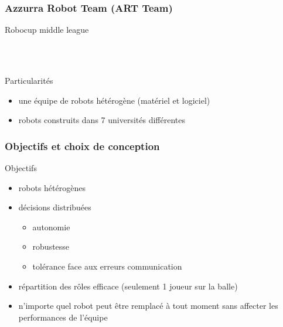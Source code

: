 \documentclass{beamer}
\begin{document}
\begin{frame}
\frametitle{Azzurra Robot Team (ART Team)}
Robocup middle league
\begin{figure}
    \centering
    ~~~
    ~~~
\end{figure}
~\\
Particularités
\begin{itemize}
	\item une équipe de robots hétérogène (matériel et logiciel)
	\item robots construits dans 7 universités différentes
\end{itemize}
\end{frame}


\begin{frame}
\frametitle{Objectifs et choix de conception}
Objectifs
\begin{itemize}
	\item robots hétérogènes
    \item décisions distribuées
    \begin{itemize}
         \item autonomie
         \item robustesse
         \item tolérance face aux erreurs communication
    \end{itemize}
    \item répartition des rôles efficace (seulement 1 joueur sur la balle) 
	\item n'importe quel robot peut être remplacé à tout moment sans affecter les performances de l'équipe
\end{itemize}
\end{frame}
\end{document}
